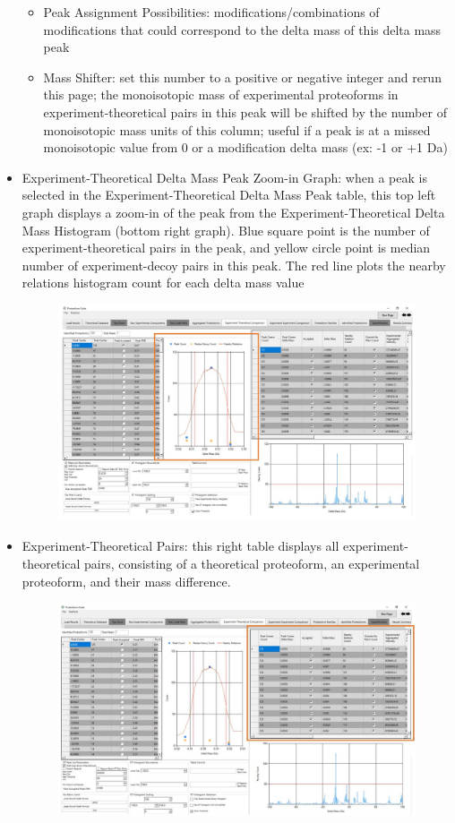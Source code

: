 \begin{itemize}
\begin{itemize}
		\item Peak Assignment Possibilities: modifications/combinations of modifications that could correspond to the delta mass of this delta mass peak
		\item Mass Shifter: set this number to a positive or negative integer and rerun this page; the monoisotopic mass of experimental proteoforms in experiment-theoretical pairs in this peak will be shifted by the number of monoisotopic mass units of this column; useful if a peak is at a missed monoisotopic value from 0 or a modification delta mass (ex: -1 or +1 Da)
	\end{itemize}
	\item Experiment-Theoretical Delta Mass Peak Zoom-in Graph: when a peak is selected in the Experiment-Theoretical Delta Mass Peak table, this top left graph displays a zoom-in of the peak from the Experiment-Theoretical Delta Mass Histogram (bottom right graph). Blue square point is the number of experiment-theoretical pairs in the peak, and yellow circle point is median number of experiment-decoy pairs in this peak. The red line plots the nearby relations histogram count for each delta mass value
		\begin{figure}[h]
\centering
\includegraphics[scale=0.44]{figures/et3.jpg}
\end{figure}
\item {Experiment-Theoretical Pairs}: this right table displays all experiment-theoretical pairs, consisting of a theoretical proteoform, an experimental proteoform, and their mass difference.
		\begin{figure}[h]
\centering
\includegraphics[scale=0.44]{figures/et4.jpg}

\end{figure}
\end{itemize}
